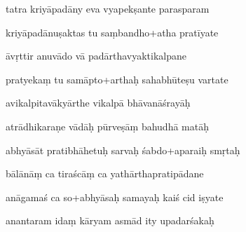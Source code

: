 \documentclass[article,12pt,a4paper]{memoir}%
\newcounter{parCount}
\begin{document}
	  
	  \pstart {} tatra kriyāpadāny eva vyapekṣante parasparam 
	{}
	\pend%
      

	  
	  \pstart \leavevmode%
	kriyāpadānuṣaktas tu saṃbandho+atha pratīyate 
	{}
	\pend%
      

	  
	  \pstart {} āvṛttir anuvādo vā padārthavyaktikalpane 
	{}
	\pend%
      

	  
	  \pstart \leavevmode%
	pratyekaṃ tu samāpto+arthaḥ sahabhūteṣu vartate 
	{}
	\pend%
      

	  
	  \pstart {} avikalpitavākyārthe vikalpā bhāvanāśrayāḥ 
	{}
	\pend%
      

	  
	  \pstart \leavevmode%
	atrādhikaraṇe vādāḥ pūrveṣāṃ bahudhā matāḥ 
	{}
	\pend%
      

	  
	  \pstart {} abhyāsāt pratibhāhetuḥ sarvaḥ śabdo+aparaiḥ smṛtaḥ 
	{}
	\pend%
      

	  
	  \pstart \leavevmode%
	bālānāṃ ca tiraścāṃ ca yathārthapratipādane 
	{}
	\pend%
      

	  
	  \pstart {} anāgamaś ca so+abhyāsaḥ samayaḥ kaiś cid iṣyate 
	{}
	\pend%
      

	  
	  \pstart \leavevmode%
	anantaram idaṃ kāryam asmād ity upadarśakaḥ 
	{}
	\pend%
      
\end{document}

